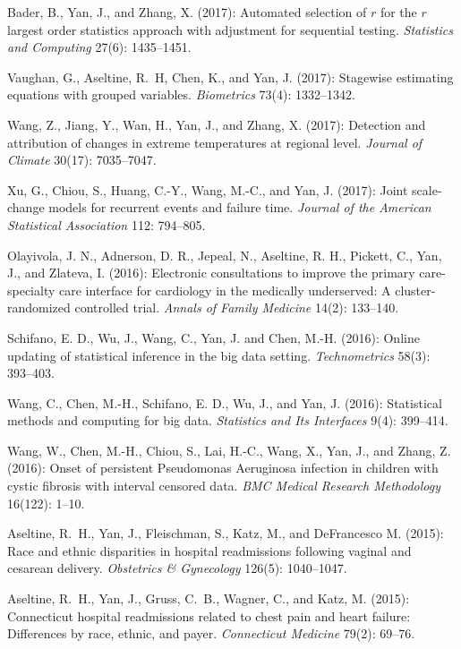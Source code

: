 \documentclass[Statistics]{vita}
\begin{document}
\begin{vita}
\begin{Publications}
\begin{RefereedJournalArticles}
 \item *Bader, B., Yan, J., and Zhang, X. (2017): Automated selection of $r$ for the $r$ largest order statistics approach with adjustment for sequential testing. {\em Statistics and Computing\/} 27(6): 1435--1451.
  \item *Vaughan, G., Aseltine, R.~H, Chen, K., and Yan, J. (2017): Stagewise estimating equations with grouped variables. {\em Biometrics\/} 73(4): 1332--1342.
  \item *Wang, Z., Jiang, Y., Wan, H., Yan, J., and Zhang, X. (2017): Detection and attribution of changes in extreme temperatures at regional level.  {\em Journal of Climate\/} 30(17): 7035--7047.
  \item Xu, G., Chiou, S., Huang, C.-Y., Wang, M.-C., and Yan, J. (2017): Joint scale-change models for recurrent events and failure time. {\em Journal of the American Statistical Association\/} 112: 794--805.
  \item Olayivola, J. N., Adnerson, D. R., Jepeal, N., Aseltine, R. H., Pickett, C., Yan, J., and Zlateva, I. (2016): Electronic consultations to improve the primary care-specialty care interface for cardiology in the medically underserved: A cluster-randomized controlled trial. {\em Annals of Family Medicine\/} 14(2): 133--140.
  \item Schifano, E. D., Wu, J., Wang, C., Yan, J. and Chen, M.-H. (2016): Online updating of statistical inference in the big data setting. {\em Technometrics\/} 58(3): 393--403.
  \item *Wang, C., Chen, M.-H., Schifano, E. D., Wu, J., and Yan, J. (2016): Statistical methods and computing for big data. {\em Statistics and Its Interfaces\/} 9(4): 399--414.
  \item *Wang, W., Chen, M.-H., Chiou, S., Lai, H.-C., Wang, X., Yan, J., and Zhang, Z. (2016): Onset of persistent Pseudomonas Aeruginosa infection in children with cystic fibrosis with interval censored data. {\em BMC Medical Research Methodology\/} 16(122): 1--10.
  \item Aseltine, R.~H., Yan, J., Fleischman, S., Katz, M., and DeFrancesco M. (2015): Race and ethnic disparities in hospital readmissions following vaginal and cesarean delivery. {\em Obstetrics \& Gynecology\/} 126(5): 1040--1047.
  \item Aseltine, R.~H., Yan, J., Gruss, C.~B., Wagner, C., and Katz, M. (2015): Connecticut hospital readmissions related to chest pain and heart failure: {D}ifferences by race, ethnic, and payer. {\em Connecticut Medicine\/} 79(2):  69--76.

\end{RefereedJournalArticles}
\end{Publications}
\end{vita}
\end{document}
